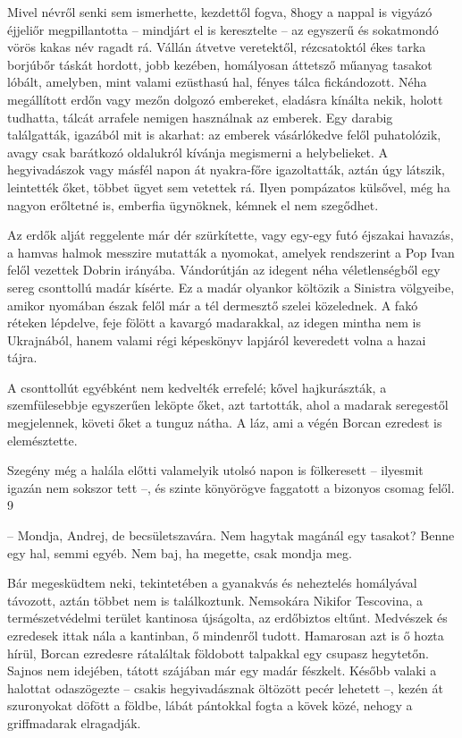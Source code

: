 \documentclass{IEEEtran}
\begin{document}
Mivel névről senki sem ismerhette, kezdettől fogva, 8hogy a nappal is vigyázó
éjjeliőr megpillantotta – mindjárt el is keresztelte – az egyszerű és
sokatmondó vörös kakas név ragadt rá. Vállán átvetve veretektől, rézcsatoktól
ékes tarka borjúbőr táskát hordott, jobb kezében, homályosan áttetsző műanyag
tasakot lóbált, amelyben, mint valami ezüsthasú hal, fényes tálca
fickándozott. Néha megállított erdőn vagy mezőn dolgozó embereket, eladásra
kínálta nekik, holott tudhatta, tálcát arrafele nemigen használnak az emberek.
Egy darabig találgatták, igazából mit is akarhat: az emberek vásárlókedve
felől puhatolózik, avagy csak barátkozó oldalukról kívánja megismerni a
helybelieket. A hegyivadászok vagy másfél napon át nyakra-főre igazoltatták,
aztán úgy látszik, leintették őket, többet ügyet sem vetettek rá. Ilyen
pompázatos külsővel, még ha nagyon erőltetné is, emberfia ügynöknek, kémnek el
nem szegődhet.

Az erdők alját reggelente már dér szürkítette, vagy egy-egy futó éjszakai
havazás, a hamvas halmok messzire mutatták a nyomokat, amelyek rendszerint a
Pop Ivan felől vezettek Dobrin irányába. Vándorútján az idegent néha
véletlenségből egy sereg csonttollú madár kísérte. Ez a madár olyankor
költözik a Sinistra völgyeibe, amikor nyomában észak felől már a tél dermesztő
szelei közelednek. A fakó réteken lépdelve, feje fölött a kavargó madarakkal,
az idegen mintha nem is Ukrajnából, hanem valami régi képeskönyv lapjáról
keveredett volna a hazai tájra.

A csonttollút egyébként nem kedvelték errefelé; kővel hajkurászták, a
szemfülesebbje egyszerűen leköpte őket, azt tartották, ahol a madarak
seregestől megjelennek, követi őket a tunguz nátha. A láz, ami a végén Borcan
ezredest is elemésztette.

Szegény még a halála előtti valamelyik utolsó napon is fölkeresett – ilyesmit
igazán nem sokszor tett –, és szinte könyörögve faggatott a bizonyos csomag
felől.
9

– Mondja, Andrej, de becsületszavára. Nem hagytak magánál egy tasakot? Benne
egy hal, semmi egyéb. Nem baj, ha megette, csak mondja meg.

Bár megesküdtem neki, tekintetében a gyanakvás és neheztelés homályával
távozott, aztán többet nem is találkoztunk. Nemsokára Nikifor Tescovina, a
természetvédelmi terület kantinosa újságolta, az erdőbiztos eltűnt. Medvészek
és ezredesek ittak nála a kantinban, ő mindenről tudott. Hamarosan azt is ő
hozta hírül, Borcan ezredesre rátaláltak földobott talpakkal egy csupasz
hegytetőn. Sajnos nem idejében, tátott szájában már egy madár fészkelt. Később
valaki a halottat odaszögezte – csakis hegyivadásznak öltözött pecér lehetett
–, kezén át szuronyokat döfött a földbe, lábát pántokkal fogta a kövek közé,
nehogy a griffmadarak elragadják.
\end{document}
